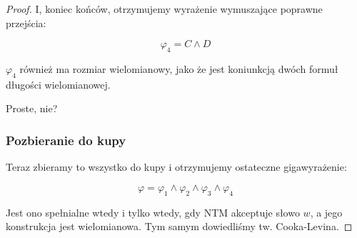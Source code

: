 \begin{proof}
        I, koniec końców, otrzymujemy wyrażenie wymuszające poprawne przejścia: 
        
        \[ 
            \varphi_4 = C \land D
        \]
        
        \(\varphi_4\) również ma rozmiar wielomianowy, jako że jest koniunkcją dwóch formuł długości wielomianowej. 
        
        Proste, nie?
        
        \subsubsection{Pozbieranie do kupy}
        
        Teraz zbieramy to wszystko do kupy i otrzymujemy ostateczne gigawyrażenie:
        
        \[ 
            \varphi = \varphi_1 \land \varphi_2 \land \varphi_3 \land \varphi_4
        \]
        
        Jest ono spełnialne wtedy i tylko wtedy, gdy NTM akceptuje słowo \(w\), a jego konstrukcja jest wielomianowa. Tym samym dowiedliśmy tw. Cooka-Levina.
\end{proof}